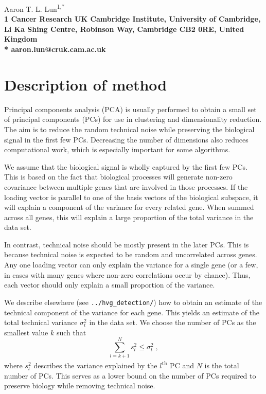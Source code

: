 \documentclass{article}
\begin{document}
\vspace*{0.35in}

\begin{flushleft}
{\Large
\textbf{}
}
\newline

Aaron T. L. Lun\textsuperscript{1,*}
\\
\bigskip
\bf{1} Cancer Research UK Cambridge Institute, University of Cambridge, Li Ka Shing Centre, Robinson Way, Cambridge CB2 0RE, United Kingdom
\\
\bigskip
* aaron.lun@cruk.cam.ac.uk

\end{flushleft}

\section{Description of method}
Principal components analysis (PCA) is usually performed to obtain a small set of principal components (PCs) for use in clustering and dimensionality reduction.
The aim is to reduce the random technical noise while preserving the biological signal in the first few PCs.
Decreasing the number of dimensions also reduces computational work, which is especially important for some algorithms.

We assume that the biological signal is wholly captured by the first few PCs.
This is based on the fact that biological processes will generate non-zero covariance between multiple genes that are involved in those processes.
If the loading vector is parallel to one of the basis vectors of the biological subspace, it will explain a component of the variance for every related gene.
When summed across all genes, this will explain a large proportion of the total variance in the data set.

In contrast, technical noise should be mostly present in the later PCs.
This is because technical noise is expected to be random and uncorrelated across genes.
Any one loading vector can only explain the variance for a single gene (or a few, in cases with many genes where non-zero correlations occur by chance).
Thus, each vector should only explain a small proportion of the variance.

We describe elsewhere (see \verb!../hvg_detection/!) how to obtain an estimate of the technical component of the variance for each gene.
This yields an estimate of the total technical variance $\sigma^2_t$ in the data set.
We choose the number of PCs as the smallest value $k$ such that 
\[
    \sum_{l=k+1}^N s^2_l  \le \sigma^2_t \;,
\]
where $s^2_l$ describes the variance explained by the $l$\textsuperscript{th} PC and $N$ is the total number of PCs.
This serves as a lower bound on the number of PCs required to preserve biology while removing technical noise.
\end{document}
